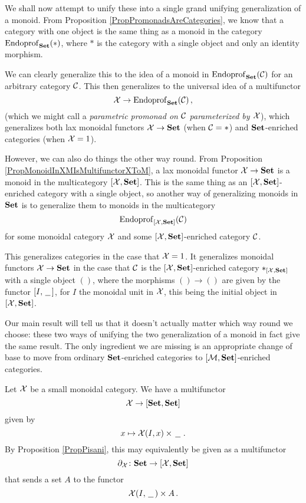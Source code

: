We shall now attempt to unify these into a single grand unifying generalization of a monoid.
From Proposition \ref{PropPromonadsAreCategories}, we know that a category with one object is the same thing as a monoid in the category $\operatorname{Endoprof}_{\normalfont\textbf{Set}}(*)$, where $*$ is the category with a single object and only an identity morphism.

We can clearly generalize this to the idea of a monoid in $\operatorname{Endoprof}_{\normalfont\textbf{Set}}({\mathcal{C}})$ for an arbitrary category ${\mathcal{C}}$.  
This then generalizes to the universal idea of a multifunctor
\[
  \mathcal X \to \operatorname{Endoprof}_{\normalfont\textbf{Set}}({\mathcal{C}})\,,
  \]
(which we might call a \emph{parametric promonad on ${\mathcal{C}}$ parameterized by $\mathcal X$}), which generalizes both lax monoidal functors $\mathcal X \to {\normalfont\textbf{Set}}$ (when ${\mathcal{C}}=*$) and ${\normalfont\textbf{Set}}$-enriched categories (when $\mathcal X=1$).

However, we can also do things the other way round.  
From Proposition \ref{PropMonoidInXMIsMultifunctorXToM}, a lax monoidal functor $\mathcal X \to {\normalfont\textbf{Set}}$ is a monoid in the multicategory $[\mathcal X,{\normalfont\textbf{Set}}]$.  
This is the same thing as an $[\mathcal X,{\normalfont\textbf{Set}}]$-enriched category with a single object, so another way of generalizing monoids in ${\normalfont\textbf{Set}}$ is to generalize them to monoids in the multicategory
\[
  \operatorname{Endoprof}_{[\mathcal X,{\normalfont\textbf{Set}}]}({\mathcal{C}})
  \]
for some monoidal category $\mathcal X$ and some $[\mathcal X,{\normalfont\textbf{Set}}]$-enriched category ${\mathcal{C}}$.

This generalizes categories in the case that $\mathcal X=1$.  
It generalizes monoidal functors $\mathcal X \to {\normalfont\textbf{Set}}$ in the case that ${\mathcal{C}}$ is the $[\mathcal X,{\normalfont\textbf{Set}}]$-enriched category $*_{[\mathcal X,{\normalfont\textbf{Set}}]}$ with a single object $()$, where the morphisms $() \to ()$ are given by the functor $[I,\,\underline{\hspace{1.5ex}}\,]$, for $I$ the monoidal unit in $\mathcal X$, this being the initial object in $[\mathcal X,{\normalfont\textbf{Set}}]$.

Our main result will tell us that it doesn't actually matter which way round we choose: these two ways of unifying the two generalization of a monoid in fact give the same result.  
The only ingredient we are missing is an appropriate change of base to move from ordinary ${\normalfont\textbf{Set}}$-enriched categories to $[\mathcal M,{\normalfont\textbf{Set}}]$-enriched categories.

\begin{definition}
  Let $\mathcal X$ be a small monoidal category.  
  We have a multifunctor
  \[
    \mathcal X \to [{\normalfont\textbf{Set}},{\normalfont\textbf{Set}}]
    \]
  given by
  \[
    x \mapsto \mathcal X(I,x) \times \,\underline{\hspace{1.5ex}}\,\,.
    \]
  By Proposition \ref{PropPisani}, this may equivalently be given as a multifunctor
  \[
    \partial_\mathcal X\colon{\normalfont\textbf{Set}} \to [\mathcal X,{\normalfont\textbf{Set}}]
    \]
  that sends a set $A$ to the functor
  \[
    \mathcal X(I,\,\underline{\hspace{1.5ex}}\,)\times A\,.
    \]
\end{definition}

